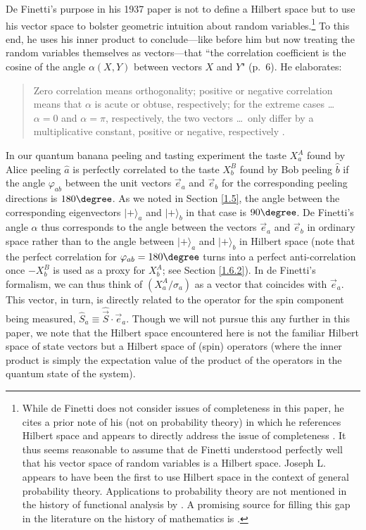 De Finetti's purpose in his 1937 paper is not to define a Hilbert space but to use his vector space to bolster geometric intuition about random variables.\footnote{While de Finetti does not consider issues of completeness in this paper, he cites a prior note of his (not on probability theory) in which he references Hilbert space and appears to directly address the issue of completeness \citep[p.\ 248 and p.\ 254, respectively]{De Finetti 1930}. It thus seems reasonable to assume that de Finetti understood perfectly well that his vector space of random variables is a Hilbert space. Joseph L.\ \citet{Doob 1934} appears to have been the first to use Hilbert space in the context of general probability theory. Applications to probability theory are not mentioned in the history of functional analysis by \citet{Birkhoff and Kreyszig 1984}. A promising source for filling this gap in the literature on the history of mathematics is \citet{Bingham 2000}.} To this end, he uses his inner product to conclude---like \citet{Fisher 1915,Fisher 1924} before him but now treating the random variables themselves as vectors---that ``the correlation coefficient is the cosine of the angle $\alpha(X,Y)$ between vectors $X$ and $Y$" (p.\ 6). He elaborates:
\begin{quote}
Zero correlation means orthogonality; positive or negative correlation means that $\alpha$ is acute or obtuse, respectively; for the extreme cases \ldots\ $\alpha = 0$ and $\alpha = \pi$, respectively, the two vectors \ldots\ only differ by a multiplicative constant, positive or negative, respectively \citep[p.\ 6]{De Finetti 1937}.
\end{quote}
In our quantum banana peeling and tasting experiment the taste $X_a^A$ found by Alice peeling $\hat{a}$ is perfectly correlated to the taste $X_b^B$ found by Bob peeling $\hat{b}$ if the angle $\varphi_{ab}$ between the unit vectors $\vec{e}_a$ and $\vec{e}_b$ for the corresponding peeling directions is $180\degree$. As we noted in Section \ref{1.5}, the angle between the corresponding eigenvectors $|+\rangle_a$ and $|+\rangle_b$ in that case is $90\degree$. De Finetti's angle $\alpha$ thus corresponds to the angle between the vectors  $\vec{e}_a$ and $\vec{e}_b$  in ordinary space rather than to the angle between $|+\rangle_a$ and $|+\rangle_b$ in Hilbert space (note that the perfect correlation for $\varphi_{ab} = 180\degree$ turns into a perfect anti-correlation once $-X_b^B$ is used as a proxy for $X_b^A$; see Section \ref{1.6.2}). In de Finetti's formalism, we can thus think of $(X^A_a/\sigma_a)$ as a vector that coincides with $\vec{e}_a$. This vector, in turn, is directly related to the operator for the spin component being measured, $\hat{S}_a \equiv \hat{\vec{S}} \cdot \vec{e}_a$. Though we will not pursue this any further in this paper, we note that the Hilbert space encountered here is not the familiar Hilbert space of state vectors but a Hilbert space of (spin) operators (where the inner product is simply the expectation value of the product of the operators in the quantum state of the system).

